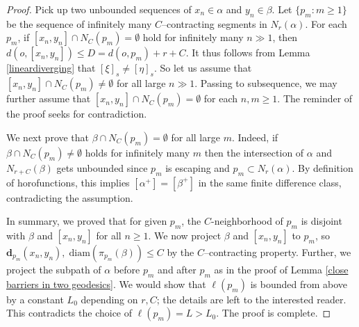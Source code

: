 \documentclass{amsart}
\theoremstyle{definition}
\theoremstyle{remark}
\newcommand{\proj}{\textbf{d}}
\newcommand{\len }{\ell}
\begin{document}
\begin{proof}
Pick up two unbounded sequences of $x_n\in \alpha$ and $y_n\in \beta$. Let $\{p_m: m\ge 1\}$ be the sequence of infinitely many $C$--contracting segments in $N_r(\alpha)$. For each $p_m$, if    $[x_n,y_n]\cap N_C(p_m)= \emptyset$ hold for infinitely many $n\gg 1$, then  $d(o,[x_n,y_n])\le D=d(o,p_m)+r+C$.  It thus follows from Lemma \ref{lineardiverging} that  $[\xi]_s\ne [\eta]_s$. So let us assume that    $[x_n,y_n]\cap N_C(p_m)\ne  \emptyset$  for all large $n\gg 1$.  Passing to  subsequence, we may further assume that $[x_n,y_n]\cap N_C(p_m)= \emptyset$ for each $n,m\ge 1$. The reminder of the proof seeks for contradiction.

We next prove that  $\beta\cap N_C(p_m)= \emptyset$ for all large $m$. Indeed, if  $\beta\cap N_C(p_m)\ne  \emptyset$ holds for infinitely many $m$ then the intersection of $\alpha$ and $N_{r+C}(\beta)$ gets unbounded since  $p_m$ is escaping and $p_m\subset N_r(\alpha)$.  By definition of horofunctions, this implies $[\alpha^+]= [\beta^+]$ in the same finite difference class, contradicting the assumption.  

In summary, we proved that for given $p_m$, the $C$-neighborhood of $p_m$ is disjoint with $\beta$ and $[x_n,y_n]$ for all $n\ge 1$.  We now project $\beta$ and $[x_n,y_n]$ to $p_m$, so $\proj_{p_m}(x_n,y_n),\; \mathrm{diam}(\pi_{p_m}(\beta))\le C$ by the $C$--contracting property. Further, we project the subpath of $\alpha$ before $p_m$ and after $p_m$ as in the proof of Lemma \ref{close barriers in two geodesics}. We would show that $\len(p_m)$ is bounded from above by a constant $L_0$ depending on  $r, C$; the details are left to the interested reader. This contradicts the choice of $\len(p_m)=L>L_0$. The proof is complete.    
\end{proof}
\end{document}
